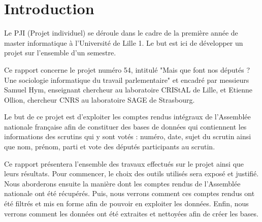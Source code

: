 \section*{Introduction}

Le PJI (Projet individuel) se déroule dans le cadre de la première année de master informatique à l'Université de Lille 1. Le but est ici de développer un projet sur l'ensemble d'un semestre.

Ce rapport concerne le projet numéro 54, intitulé "Mais que font nos députés ? Une sociologie informatique du travail parlementaire" et encadré par messieurs Samuel Hym, enseignant chercheur au laboratoire CRIStAL de Lille, et Etienne Ollion, chercheur CNRS au laboratoire SAGE de Strasbourg.

Le but de ce projet est d'exploiter les comptes rendus intégraux de l'Assemblée nationale française afin de constituer des bases de données qui contiennent les informations des scrutins qui y sont votés : numéro, date, sujet du scrutin ainsi que nom, prénom, parti et vote des députés participants au scrutin.

Ce rapport présentera l'ensemble des travaux effectués sur le projet ainsi que leurs résultats. Pour commencer, le choix des outils utilisés sera exposé et justifié. Nous aborderons ensuite la manière dont les comptes rendus de l'Assemblée nationale ont été récupérés. Puis, nous verrons comment ces comptes rendus ont été filtrés et mis en forme afin de pouvoir en exploiter les données. Enfin, nous verrons comment les données ont été extraites et nettoyées afin de créer les bases.
